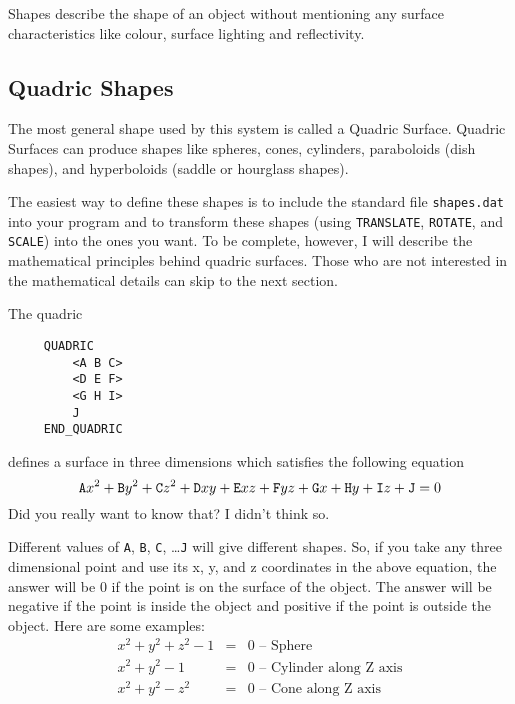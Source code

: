 Shapes describe the shape of an object without mentioning any surface
characteristics like colour, surface lighting and reflectivity.

\subsection{Quadric Shapes}

The most general shape used by this system is called a Quadric Surface.
Quadric Surfaces can produce shapes like spheres, cones, cylinders,
paraboloids (dish shapes), and hyperboloids (saddle or hourglass
shapes).

The easiest way to define these shapes is to include the standard file
{\tt shapes.dat} into
your program and to transform these shapes
(using {\tt TRANSLATE}, {\tt ROTATE}, and {\tt SCALE}) into the ones
you want.  To be complete, however, I will describe the mathematical
principles behind quadric surfaces.  Those who are not interested in
the mathematical details can skip to the next section.

The quadric
\begin{verbatim}
     QUADRIC
         <A B C>
         <D E F>
         <G H I>
         J
     END_QUADRIC
\end{verbatim}
defines a surface in three dimensions which satisfies the following
equation
\begin{displaymath}
{\tt A}x^{2} + {\tt B}y^{2} + {\tt C}z^{2} +
{\tt D}xy + {\tt E}xz + {\tt F}yz + {\tt G}x + {\tt H}y +{\tt I}z +
{\tt J} = 0
\end{displaymath}
Did you really want to know that?  I didn't think so.

Different values of {\tt A}, {\tt B}, {\tt C}, \ldots {\tt J} will
give different shapes.  So, if you take any three dimensional point
and use its x, y, and z coordinates in the above equation, the answer
will be 0 if the point is on the surface of the object.  The answer
will be negative if the point is inside the object and positive if the
point is outside the object.  Here are some examples:
\begin{eqnarray*}
x^{2} + y^{2} + z^{2} - 1 & = & 0 \mbox{\ -- Sphere} \\
x^{2} + y^{2} - 1 & = & 0 \mbox{\ -- Cylinder along Z axis} \\
x^{2} + y^{2} - z^{2} & = & 0 \mbox{\ -- Cone along Z axis}
\end{eqnarray*}

